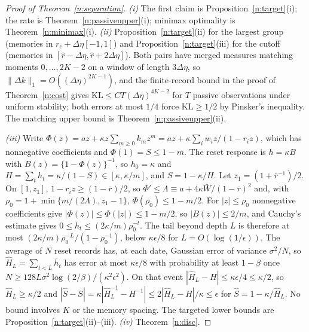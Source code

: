 \documentclass[11pt,letterpaper]{article}
\theoremstyle{definition}
\newcommand{\KL}{\mathrm{KL}}
\begin{document}
\begin{proof}[Proof of Theorem~\ref{n:separation}]
\emph{(i)} The first claim is Proposition~\ref{n:target}(i); the rate is Theorem~\ref{n:passiveupper}(i); minimax optimality is Theorem~\ref{n:minimax}(i). \emph{(ii)} Proposition~\ref{n:target}(ii) for the largest group (memories in $r_c + \Delta\eta[-1, 1]$) and Proposition~\ref{n:target}(iii) for the cutoff (memories in $[\hat r - \Delta\eta, \hat r + 2\Delta\eta]$). Both pairs have merged measures matching moments $0, \dots, 2K-2$ on a window of length $3\Delta\eta$, so $\|\Delta k\|_1 = O((\Delta\eta)^{2K-1})$, and the finite-record bound in the proof of Theorem~\ref{n:cost} gives $\KL \le C T (\Delta\eta)^{4K-2}$ for $T$ passive observations under uniform stability; both errors at most $1/4$ force $\KL \ge 1/2$ by Pinsker's inequality. The matching upper bound is Theorem~\ref{n:passiveupper}(ii).

\emph{(iii)} Write $\Phi(z) = a z + \kappa z \sum_{m \ge 0} k_m z^m = a z + \kappa \sum_i w_i z/(1 - r_i z)$, which has nonnegative coefficients and $\Phi(1) = S \le 1 - m$. The reset response is $h = \kappa B$ with $B(z) = \{1 - \Phi(z)\}^{-1}$, so $h_0 = \kappa$ and $H = \sum_t h_t = \kappa/(1 - S) \in [\kappa, \kappa/m]$, and $S = 1 - \kappa/H$. Let $z_1 = (1 + \bar r^{-1})/2$. On $[1, z_1]$, $1 - r_i z \ge (1 - \bar r)/2$, so $\Phi' \le \Lambda \equiv a + 4\kappa\bar W/(1 - \bar r)^2$ and, with $\rho_0 = 1 + \min\{m/(2\Lambda), z_1 - 1\}$, $\Phi(\rho_0) \le 1 - m/2$. For $|z| \le \rho_0$ nonnegative coefficients give $|\Phi(z)| \le \Phi(|z|) \le 1 - m/2$, so $|B(z)| \le 2/m$, and Cauchy's estimate gives $0 \le h_t \le (2\kappa/m)\rho_0^{-t}$. The tail beyond depth $L$ is therefore at most $(2\kappa/m)\rho_0^{-L}/(1 - \rho_0^{-1})$, below $\kappa\epsilon/8$ for $L = O(\log(1/\epsilon))$. The average of $N$ reset records has, at each date, Gaussian error of variance $\sigma^2/N$, so $\hat H_L = \sum_{t < L} \bar h_t$ has error at most $\kappa\epsilon/8$ with probability at least $1 - \beta$ once $N \ge 128 L \sigma^2 \log(2/\beta)/(\kappa^2 \epsilon^2)$. On that event $|\hat H_L - H| \le \kappa\epsilon/4 \le \kappa/2$, so $\hat H_L \ge \kappa/2$ and $|\hat S - S| = \kappa|\hat H_L^{-1} - H^{-1}| \le 2|\hat H_L - H|/\kappa \le \epsilon$ for $\hat S = 1 - \kappa/\hat H_L$. No bound involves $K$ or the memory spacing. The targeted lower bounds are Proposition~\ref{n:target}(ii)--(iii). \emph{(iv)} Theorem~\ref{n:disc}.
\end{proof}
\end{document}
